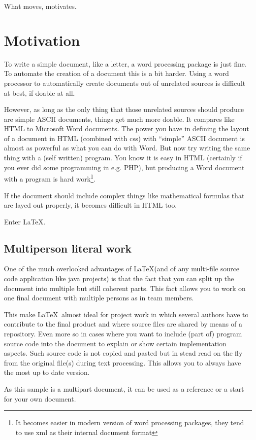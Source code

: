 \renewcommand\TheFile{ch02_motivates.tex}

\begin{savequote}[15cm]
  \raggedleft
  \sffamily
  What moves, motivates.
\end{savequote}
\chapter{Motivation}
To write a simple document, like a letter, a word processing package 
is just fine.
To automate the creation of a document this is a bit harder. 
Using a word processor to automatically create documents out of 
unrelated sources is difficult at best, if doable at all.

However, as long as the only thing that those unrelated sources should
produce are simple ASCII documents, things get much more
doable. It compares like HTML to Microsoft Word documents. The power
you have in defining the layout of a document in HTML (combined with
css) with ``simple'' ASCII document is almost as powerful as what you
can do with Word. But now try writing the same thing with a (self
written) program. You know it is easy in HTML (certainly if you ever
did some programming in e.g. PHP), but producing a Word document with
a program is hard work\footnote{It becomes easier in modern version of
word processing packages, they tend to use xml as their internal document format}. 

If the document should include complex things like mathematical
formulas that are layed out properly, it becomes difficult in HTML too.

Enter \LaTeX.

\section{Multiperson literal work}
One of the much overlooked advantages of \LaTeX (and of any multi-file
source code application like java projects) is that the fact that you
can split up the document into multiple but still coherent parts.
This fact allows you to work on one final document with multiple
persons as in team members.

This make \LaTeX\ almost ideal for project work in which several
authors have to contribute to the final product and where source files
are shared by means of a repository. Even more so in
cases where you want to include (part of) program source code
into the document to explain or show certain implementation
aspects. Such source code is not copied and pasted but in stead read
on the fly from the original file(s) during text processing. This
allows you to always have the most up to date version.

As this sample is a multipart document, it can be used as a reference
or a start for your own document.

